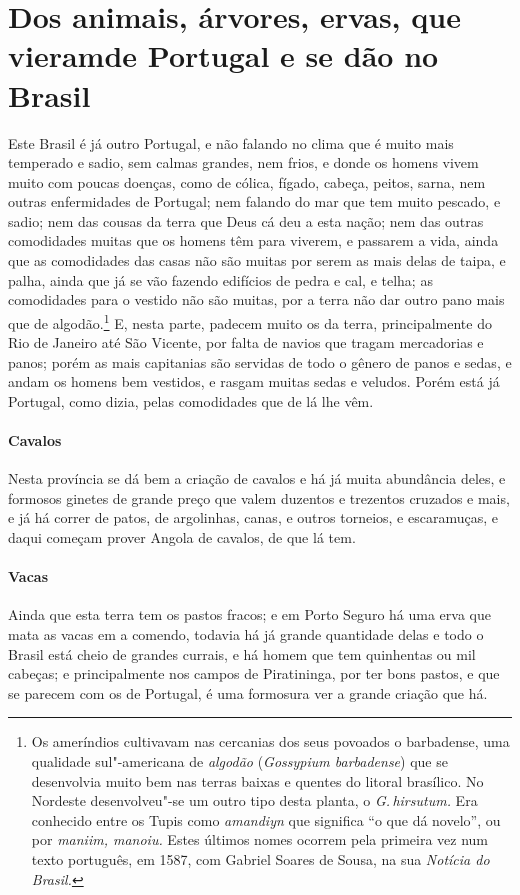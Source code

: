 \section[Dos animais, árvores, ervas, que vieram de Portugal]{Dos animais, árvores, ervas, que vieram\break de Portugal e se dão no Brasil}
 Este Brasil é já outro Portugal, e não falando no clima que é muito
mais temperado e sadio, sem calmas grandes, nem frios, e donde os
homens vivem muito com poucas doenças, como de cólica, fígado, cabeça,
peitos, sarna, nem outras enfermidades de Portugal; nem falando do mar
que tem muito pescado, e sadio; nem das cousas da terra que Deus cá deu
a esta nação; nem das outras comodidades muitas que os homens têm para
viverem, e passarem a vida, ainda que as comodidades das casas não são
muitas por serem as mais delas de taipa, e palha, ainda que já se vão
fazendo edifícios de pedra e cal, e telha; as comodidades para o
vestido não são muitas, por a terra não dar outro pano mais que de
algodão.\footnote{ Os ameríndios cultivavam nas cercanias dos seus
povoados o barbadense, uma qualidade sul"-americana de \textit{algodão}
(\textit{Gossypium barbadense}) que se desenvolvia muito bem nas terras baixas
e quentes do litoral brasílico. No Nordeste desenvolveu"-se um outro
tipo desta planta, o \textit{G.\,hirsutum.} Era conhecido entre os Tupis
como \textit{amandiyn} que significa ``o que dá novelo'', ou por
\textit{maniim, manoiu.} Estes últimos nomes ocorrem pela primeira vez
num texto português, em 1587, com Gabriel Soares de Sousa, na sua
\textit{Notícia do Brasil.}} E, nesta parte, padecem muito os da terra,
principalmente do Rio de Janeiro até São Vicente, por falta de navios
que tragam mercadorias e panos; porém as mais capitanias são servidas
de todo o gênero de panos e sedas, e andam os homens bem vestidos, e
rasgam muitas sedas e veludos. Porém está já Portugal, como dizia,
pelas comodidades que de lá lhe vêm.

\paragraph{Cavalos} Nesta província se dá bem a criação de cavalos e há
já muita abundância deles, e formosos ginetes de grande preço que valem
duzentos e trezentos cruzados e mais, e já há correr de patos, de
argolinhas, canas, e outros torneios, e escaramuças, e daqui começam
prover Angola de cavalos, de que lá tem.

\paragraph{Vacas} Ainda que esta terra tem os pastos fracos; e em Porto
Seguro há uma erva que mata as vacas em a comendo, todavia há já grande
quantidade delas e todo o Brasil está cheio de grandes currais, e há
homem que tem quinhentas ou mil cabeças; e principalmente nos campos de
Piratininga, por ter bons pastos, e que se parecem com os de Portugal,
é uma formosura ver a grande criação que há.

